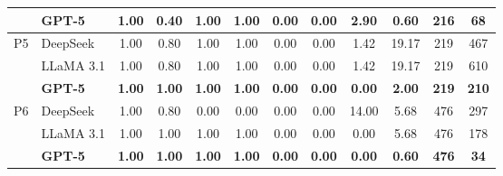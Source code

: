 \documentclass[review,12pt]{elsarticle}
\begin{document}
\begin{table}[htbp]
\begin{adjustbox}{max width=\textwidth}
\begin{tabular}{c l c c c c c c c c c c}
   & GPT-5 & 1.00 & 0.40 & 1.00 & 1.00 & 0.00 & 0.00 & 2.90 & 0.60 & 216 & 68 \\
\midrule
P5 & DeepSeek & 1.00 & 0.80 & 1.00 & 1.00 & 0.00 & 0.00 & 1.42 & 19.17 & 219 & 467 \\[-4pt]
   & LLaMA 3.1 & 1.00 & 0.80 & 1.00 & 1.00 & 0.00 & 0.00 & 1.42 & 19.17 & 219 & 610 \\[-4pt]
   & \textbf{GPT-5} & \textbf{1.00} & \textbf{1.00} & \textbf{1.00} & \textbf{1.00} & \textbf{0.00} & \textbf{0.00} & \textbf{0.00} & \textbf{2.00} & \textbf{219} & \textbf{210} \\
\midrule
P6 & DeepSeek & 1.00 & 0.80 & 0.00 & 0.00 & 0.00 & 0.00 & 14.00 & 5.68 & 476 & 297 \\[-4pt]
   & LLaMA 3.1 & 1.00 & 1.00 & 1.00 & 1.00 & 0.00 & 0.00 & 0.00 & 5.68 & 476 & 178 \\[-4pt]
   & \textbf{GPT-5} & \textbf{1.00} & \textbf{1.00} & \textbf{1.00} & \textbf{1.00} & \textbf{0.00} & \textbf{0.00} & \textbf{0.00} & \textbf{0.60} & \textbf{476} & \textbf{34} \\
\bottomrule
\end{tabular}
\end{adjustbox}
\end{table}
\end{document}
